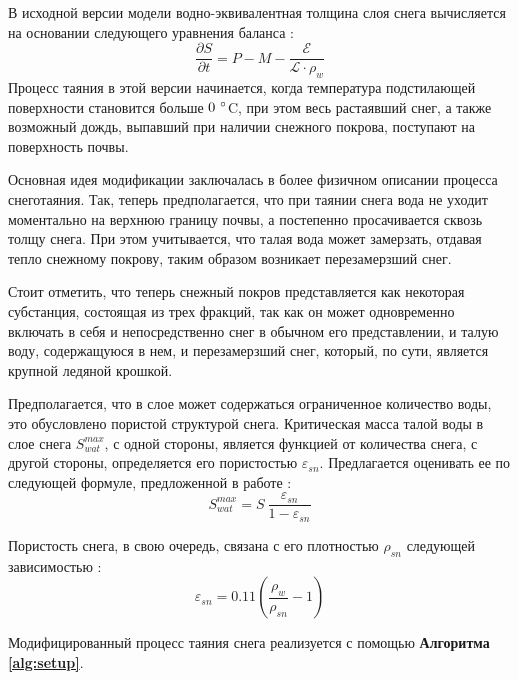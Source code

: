 \documentclass[a4paper, fontsize=14pt]{scrartcl}
\begin{document}
В исходной версии модели водно-эквивалентная толщина слоя снега вычисляется на основании следующего уравнения баланса \cite{Volodin1998, Volodina2000}:
\begin{equation}
    \dfrac{\partial S}{\partial t} = P - M - \dfrac{\mathcal{E}}{\mathcal{L} \cdot \rho_w}  \label{sys}
\end{equation}
Процесс таяния в этой версии начинается, когда температура подстилающей поверхности становится больше $0 ~\degree$C, при этом весь растаявший снег, а также возможный дождь, выпавший при наличии снежного покрова, поступают на поверхность почвы.


Основная идея модификации заключалась в более физичном описании процесса снеготаяния. Так, теперь предполагается, что при таянии снега вода не уходит моментально на верхнюю границу почвы, а постепенно просачивается сквозь толщу снега. При этом учитывается, что талая вода может замерзать, отдавая тепло снежному покрову, таким образом возникает перезамерзший снег. 

Стоит отметить, что теперь снежный покров представляется как некоторая субстанция, состоящая из трех фракций, так как он может одновременно включать в себя и непосредственно снег в обычном его представлении, и талую воду, содержащуюся в нем, и перезамерзший снег, который, по сути, является крупной ледяной крошкой. 

Предполагается, что в слое может содержаться ограниченное количество воды, это обусловлено пористой структурой снега. Критическая масса талой воды в слое снега $S_{wat}^{max}$, с одной стороны, является функцией от количества снега, с другой стороны, определяется его пористостью $\varepsilon_{sn}$. Предлагается оценивать ее по следующей формуле, предложенной в работе \cite{Gusev2002}:
\begin{equation}
     S_{wat}^{max} = S ~\dfrac{\varepsilon_{sn}}{1 - \varepsilon_{sn}}  \label{sys}  
\end{equation}

Пористость снега, в свою очередь, связана с его плотностью $\rho_{sn}$ следующей зависимостью \cite{Stock}:
\begin{equation}
    \varepsilon_{sn} = 0.11 \left( \dfrac{\rho_w}{\rho_{sn}} - 1 \right)  \label{sys}  
\end{equation}

Модифицированный процесс таяния снега реализуется с помощью \textbf{Алгоритма \ref{alg:setup}}.

\newpage
~
\end{document}
